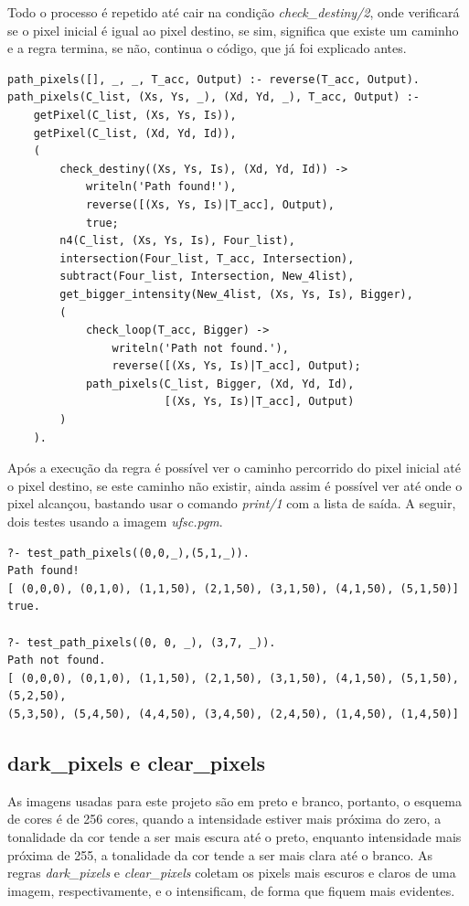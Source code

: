 \documentclass{article}
\begin{document}
        Todo o processo é repetido até cair na condição \textit{check\_destiny/2}, onde verificará se o pixel inicial é igual ao pixel destino, se sim, significa que existe um caminho e a regra termina, se não, continua o código, que já foi explicado antes.
        \begin{lstlisting}[frame=single]
path_pixels([], _, _, T_acc, Output) :- reverse(T_acc, Output).
path_pixels(C_list, (Xs, Ys, _), (Xd, Yd, _), T_acc, Output) :-
    getPixel(C_list, (Xs, Ys, Is)),
    getPixel(C_list, (Xd, Yd, Id)),
    (
        check_destiny((Xs, Ys, Is), (Xd, Yd, Id)) ->
            writeln('Path found!'),
            reverse([(Xs, Ys, Is)|T_acc], Output),
            true;
        n4(C_list, (Xs, Ys, Is), Four_list),
        intersection(Four_list, T_acc, Intersection),
        subtract(Four_list, Intersection, New_4list),
        get_bigger_intensity(New_4list, (Xs, Ys, Is), Bigger),
        (
            check_loop(T_acc, Bigger) ->
                writeln('Path not found.'),
                reverse([(Xs, Ys, Is)|T_acc], Output);
            path_pixels(C_list, Bigger, (Xd, Yd, Id), 
                        [(Xs, Ys, Is)|T_acc], Output)
        )
    ).
        \end{lstlisting}
        
        Após a execução da regra é possível ver o caminho percorrido do pixel inicial até o pixel destino, se este caminho não existir, ainda assim é possível ver até onde o pixel alcançou, bastando usar o comando \textit{print/1} com a lista de saída. A seguir, dois testes usando a imagem \textit{ufsc.pgm}.

        \begin{verbatim}
?- test_path_pixels((0,0,_),(5,1,_)).
Path found!
[ (0,0,0), (0,1,0), (1,1,50), (2,1,50), (3,1,50), (4,1,50), (5,1,50)]
true.

?- test_path_pixels((0, 0, _), (3,7, _)).
Path not found.
[ (0,0,0), (0,1,0), (1,1,50), (2,1,50), (3,1,50), (4,1,50), (5,1,50), (5,2,50),
(5,3,50), (5,4,50), (4,4,50), (3,4,50), (2,4,50), (1,4,50), (1,4,50)]
    \end{verbatim}

    \newpage
    \subsection*{dark\_pixels e clear\_pixels}
        As imagens usadas para este projeto são em preto e branco, portanto, o esquema de cores é de 256 cores, quando a intensidade estiver mais próxima do zero, a tonalidade da cor tende a ser mais escura até o preto, enquanto intensidade mais próxima de 255, a tonalidade da cor tende a ser mais clara até o branco. As regras \textit{dark\_pixels} e \textit{clear\_pixels} coletam os pixels mais escuros e claros de uma imagem, respectivamente, e o intensificam, de forma que fiquem mais evidentes.
        
\end{document}
